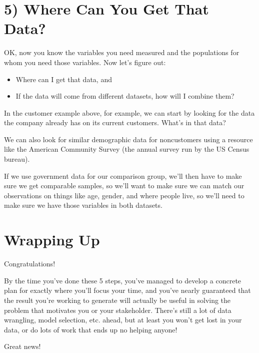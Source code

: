 \documentclass[letterpaper,10pt,english]{jupyterBook}
\begin{document}
\section{5) Where Can You Get That Data?}
\label{\detokenize{40_in_practice/00_backwards_design:where-can-you-get-that-data}}
\sphinxAtStartPar
OK, now you know the variables you need measured and the populations for whom you need those variables. Now let’s figure out:
\begin{itemize}
\item {} 
\sphinxAtStartPar
Where can I get that data, and

\item {} 
\sphinxAtStartPar
If the data will come from different datasets, how will I combine them?

\end{itemize}

\sphinxAtStartPar
In the customer example above, for example, we can start by looking for the data the company already has on its current customers. What’s in that data?

\sphinxAtStartPar
We can also look for similar demographic data for non\sphinxhyphen{}customers using a resource like the American Community Survey (the annual survey run by the US Census bureau).

\sphinxAtStartPar
If we use government data for our comparison group, we’ll then have to make sure we get comparable samples, so we’ll want to make sure we can match our observations on things like age, gender, and where people live, so we’ll need to make sure we have those variables in both datasets.


\section{Wrapping Up}
\label{\detokenize{40_in_practice/00_backwards_design:wrapping-up}}
\sphinxAtStartPar
Congratulations!

\sphinxAtStartPar
By the time you’ve done these 5 steps, you’ve managed to develop a concrete plan for exactly where you’ll focus your time, and you’ve nearly guaranteed that the result you’re working to generate will actually be useful in solving the problem that motivates you or your stakeholder. There’s still a lot of data wrangling, model selection, etc. ahead, but at least you won’t get lost in your data, or do lots of work that ends up no helping anyone!

\sphinxAtStartPar
{} Great news! 
\end{document}

